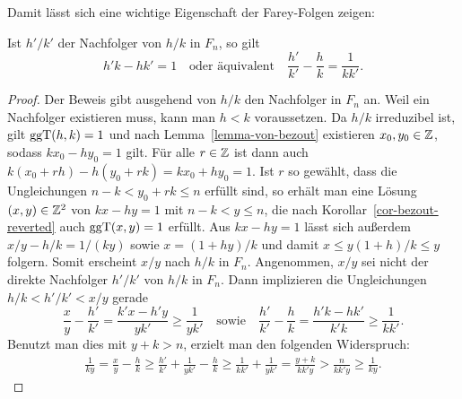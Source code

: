 Damit lässt sich eine wichtige Eigenschaft der Farey-Folgen zeigen:
\begin{lemma}\label{lemma-basic-property-farey-successor}
	Ist $h'/k'$ der Nachfolger von $h/k$ in $F_n$, so gilt \[
	h'k - hk' = 1 \text{~~~oder äquivalent~~~} \frac{h'}{k'} - \frac{h}{k} = \frac{1}{kk'}.
	\]
\end{lemma}
\begin{proof}
	Der Beweis gibt ausgehend von $h/k$ den Nachfolger in $F_n$ an.
	Weil ein Nachfolger existieren muss, kann man $h<k$ voraussetzen.
	Da $h/k$ irreduzibel ist, gilt $\operatorname{ggT}(h,k)= 1$ und nach Lemma~\ref{lemma-von-bezout} existieren $x_0, y_0\in\mathbb{Z}$, sodass $kx_0 -hy_0 = 1$ gilt.
	Für alle $r\in\mathbb{Z}$ ist dann auch $k(x_0 + rh) - h(y_0 + rk) = k x_0 + hy_0 = 1$.
	Ist $r$ so gewählt, dass die Ungleichungen $n-k<y_0 +rk \leq n$ erfüllt sind, so erhält man eine Lösung $(x,y)\in\mathbb{Z}^2$ von $kx - hy = 1$ mit $n-k<y\leq n$, die nach Korollar~\ref{cor-bezout-reverted} auch $\operatorname{ggT}(x,y)=1$ erfüllt.
	Aus $kx-hy=1$ lässt sich außerdem $x/y - h/k = 1/(ky)$ sowie $x = (1+hy)/k$ und damit $x \leq y(1+h)/k \leq y$ folgern.
	Somit erscheint $x/y$ nach $h/k$ in $F_n$.
	Angenommen, $x/y$ sei nicht der direkte Nachfolger $h'/k'$ von $h/k$ in $F_n$.
	Dann implizieren die Ungleichungen $h/k < h'/k' < x/y$ gerade \[
	\frac{x}{y} - \frac{h'}{k'} = \frac{k'x-h'y}{yk'} \geq \frac{1}{yk'}\text{~~~sowie~~~} \frac{h'}{k'} - \frac{h}{k} = \frac{h'k - hk'}{k'k} \geq \frac{1}{kk'}. \]
	Benutzt man dies mit $y+k > n$, erzielt man den folgenden Widerspruch:
	\setlength{\belowdisplayskip}{0em}
	\begin{align*}
		\frac{1}{ky} = \frac{x}{y} - \frac{h}{k} \geq \frac{h'}{k'} + \frac{1}{yk'}- \frac{h}{k} \geq \frac{1}{kk'} + \frac{1}{yk'} = \frac{y+k}{kk'y} > \frac{n}{kk'y} \geq \frac{1}{ky}.
	\end{align*}
\end{proof}

